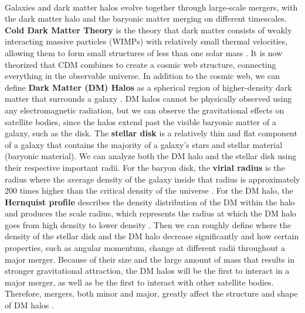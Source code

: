 \documentclass[fleqn,usenatbib]{mnras}
\begin{document}
\paragraph{} Galaxies and dark matter halos evolve together through large-scale mergers, with the dark matter halo and the baryonic matter merging on different timescales. \textbf{Cold Dark Matter Theory} is the theory that dark matter consists of weakly interacting massive particles (WIMPs) with relatively small thermal velocities, allowing them to form small structures of less than one solar mass \citep{Diemand+2011}. It is now theorized that CDM combines to create a cosmic web structure, connecting everything in the observable universe. In addition to the cosmic web, we can define \textbf{Dark Matter (DM) Halos} as a spherical region of higher-density dark matter that surrounds a galaxy \citep{Drakos+2019}. DM halos cannot be physically observed using any electromagnetic radiation, but we can observe the gravitational effects on satellite bodies, since the halos extend past the visible baryonic matter of a galaxy, such as the disk. The \textbf{stellar disk} is a relatively thin and flat component of a galaxy that contains the majority of a galaxy's stars and stellar material (baryonic material). We can analyze both the DM halo and the stellar disk using their respective important radii. For the baryon disk, the \textbf{virial radius} is the radius where the average density of the galaxy inside that radius is approximately 200 times higher than the critical density of the universe \citep{Salucci+2007}. For the DM halo, the \textbf{Hernquist profile} describes the density distribution of the DM within the halo and produces the scale radius, which represents the radius at which the DM halo goes from high density to lower density \citep{Hern+1990, Dubinski+1999}. Then we can roughly define where the density of the stellar disk and the DM halo decrease significantly and how certain properties, such as angular momentum, change at different radii throughout a major merger. Because of their size and the large amount of mass that results in stronger gravitational attraction, the DM halos will be the first to interact in a major merger, as well as be the first to interact with other satellite bodies. Therefore, mergers, both minor and major, greatly affect the structure and shape of DM halos \citep{Drakos+2019}.
\end{document}
